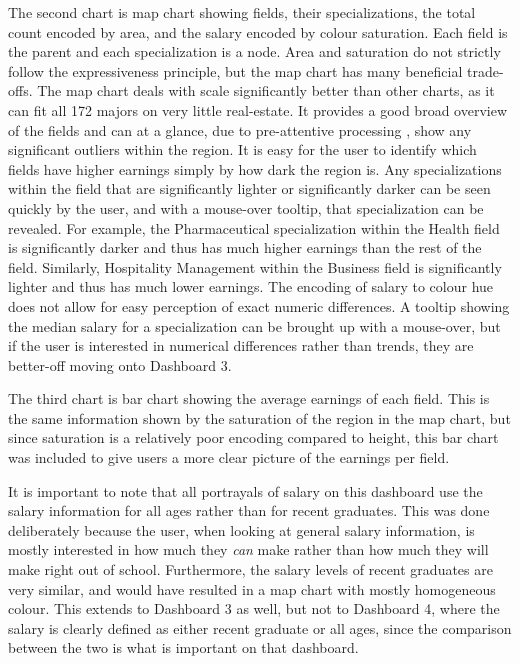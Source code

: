 \documentclass[sigchi]{acmart}
\begin{document}
The second chart is map chart showing fields, their specializations, the total count encoded by area, and the salary encoded by colour saturation. Each field is the parent and each specialization is a node. Area and saturation do not strictly follow the expressiveness principle, but the map chart has many beneficial trade-offs. The map chart deals with scale significantly better than other charts, as it can fit all 172 majors on very little real-estate. It provides a good broad overview of the fields and can at a glance, due to pre-attentive processing \cite{munzner}, show any significant outliers within the region. It is easy for the user to identify which fields have higher earnings simply by how dark the region is. Any specializations within the field that are significantly lighter or significantly darker can be seen quickly by the user, and with a mouse-over tooltip, that specialization can be revealed. For example, the Pharmaceutical specialization within the Health field is significantly darker and thus has much higher earnings than the rest of the field. Similarly, Hospitality Management within the Business field is significantly lighter and thus has much lower earnings. The encoding of salary to colour hue does not allow for easy perception of exact numeric differences. A tooltip showing the median salary for a specialization can be brought up with a mouse-over, but if the user is interested in numerical differences rather than trends, they are better-off moving onto Dashboard 3.

The third chart is bar chart showing the average earnings of each field. This is the same information shown by the saturation of the region in the map chart, but since saturation is a relatively poor encoding compared to height, this bar chart was included to give users a more clear picture of the earnings per field.

It is important to note that all portrayals of salary on this dashboard use the salary information for all ages rather than for recent graduates. This was done deliberately because the user, when looking at general salary information, is mostly interested in how much they \textit{can} make rather than how much they will make right out of school. Furthermore, the salary levels of recent graduates are very similar, and would have resulted in a map chart with mostly homogeneous colour. This extends to Dashboard 3 as well, but not to Dashboard 4, where the salary is clearly defined as either recent graduate or all ages, since the comparison between the two is what is important on that dashboard.
\end{document}
